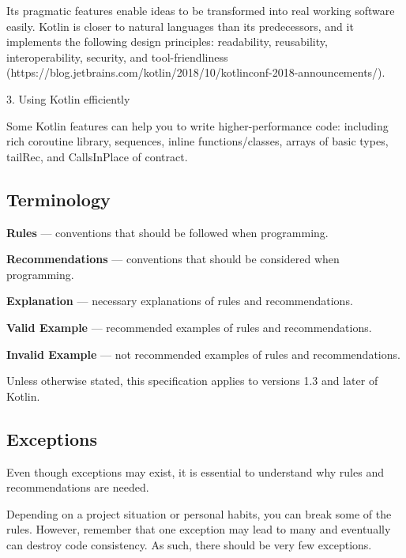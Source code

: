 {{{{    Its pragmatic features enable ideas to be transformed into real working software easily. Kotlin is closer to natural languages than its predecessors, and it implements the following design principles: readability, reusability, interoperability, security, and tool-friendliness (https://blog.jetbrains.com/kotlin/2018/10/kotlinconf-2018-announcements/).



3. Using Kotlin efficiently



    Some Kotlin features can help you to write higher-performance code: including rich coroutine library, sequences, inline functions/classes, arrays of basic types, tailRec, and CallsInPlace of contract.



\subsection*{\textbf{Terminology}}




\textbf{Rules} — conventions that should be followed when programming.



\textbf{Recommendations} — conventions that should be considered when programming.



\textbf{Explanation} — necessary explanations of rules and recommendations.



\textbf{Valid Example} — recommended examples of rules and recommendations.



\textbf{Invalid Example} — not recommended examples of rules and recommendations.



Unless otherwise stated, this specification applies to versions 1.3 and later of Kotlin.



\subsection*{\textbf{Exceptions}}




Even though exceptions may exist, it is essential to understand why rules and recommendations are needed.

Depending on a project situation or personal habits, you can break some of the rules. However, remember that one exception may lead to many and eventually can destroy code consistency. As such, there should be very few exceptions.

}}}}

